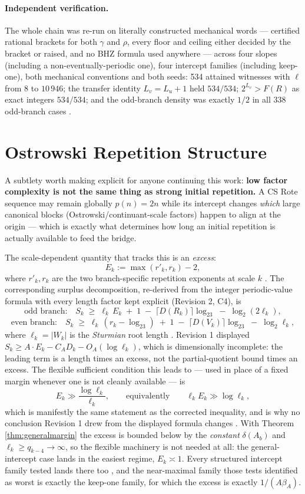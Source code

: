 \documentclass[11pt]{article}
\begin{document}
\paragraph{Independent verification.} The whole chain was re-run on literally constructed mechanical
words --- certified rational brackets for both $\gamma$ and $\rho$, every floor and ceiling either
decided by the bracket or raised, and no BHZ formula used anywhere --- across four slopes
(including a non-eventually-periodic one), four intercept families (including keep-one), both
mechanical conventions and both seeds: 534 attained witnesses with $\ell$ from $8$ to $10\,946$;
the transfer identity $L_v=L_u+1$ held $534/534$; $2^{L_v}>F(R)$ as exact integers $534/534$; and
the odd-branch density was exactly $1/2$ in all $338$ odd-branch cases \cite{Phase8Chain}.

\section{Ostrowski Repetition Structure}
\label{sec:ostrowski}

A subtlety worth making explicit for anyone continuing this work: \textbf{low factor complexity is not the same thing as strong initial repetition.} A CS Rote sequence may remain globally $p(n)=2n$ while its intercept changes \emph{which} large canonical blocks (Ostrowski/continuant-scale factors) happen to align at the origin --- which is exactly what determines how long an initial repetition is actually available to feed the bridge.

The scale-dependent quantity that tracks this is an \emph{excess}:
\[
E_k := \max(r'_k, r_k) - 2,
\]
where $r'_k,r_k$ are the two branch-specific repetition exponents at scale $k$ \cite{Phase7Surplus}. The corresponding surplus decomposition, re-derived from the integer periodic-value formula with
every length factor kept explicit (Revision 2, C4), is
\[
\text{odd branch:}\quad S_k \;\ge\; \ell_k\,E_k \;+\;1\;-\;\lceil D(R_k)\rceil\log_23\;-\;\log_2(2\ell_k),
\]
\[
\text{even branch:}\quad S_k \;\ge\; \ell_k\,(r_k-\log_23)\;+\;1\;-\;\lceil D(V_k)\rceil\log_23\;-\;\log_2\ell_k,
\]
where $\ell_k=|W_k|$ is the \emph{Sturmian} root length \cite{Phase8Proof}. Revision 1 displayed
$S_k\ge A\cdot E_k-C_A D_k-O_A(\log\ell_k)$, which is dimensionally incomplete: the leading term is
a length times an excess, not the partial-quotient bound times an excess. The flexible sufficient
condition this leads to --- used in place of a fixed margin whenever one is not cleanly available ---
is
\[
E_k \gg \frac{\log \ell_k}{\ell_k}, \qquad\text{equivalently}\qquad \ell_kE_k\gg\log\ell_k,
\]
which is manifestly the same statement as the corrected inequality, and is why no conclusion Revision
1 drew from the displayed formula changes \cite{Phase7Flexible}. With Theorem
\ref{thm:generalmargin} the excess is bounded below by the \emph{constant} $\delta(A_b)$ and
$\ell_k\ge q_{k-4}\to\infty$, so the flexible machinery is not needed at all: the general-intercept
case lands in the easiest regime, $E_k\asymp1$. Every structured intercept family tested lands there
too \cite{Phase7Structured}, and the near-maximal family those tests identified as worst is exactly
the keep-one family, for which the excess is exactly $1/(A\beta_A)$.
\end{document}
